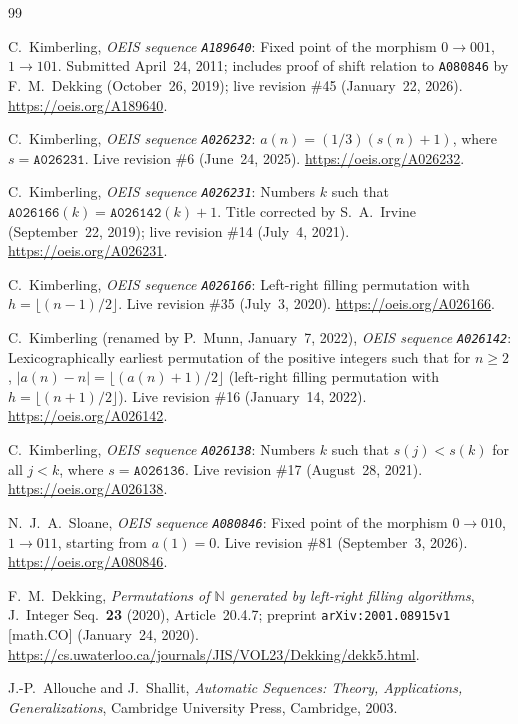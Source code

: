 \documentclass[11pt]{article}
\theoremstyle{definition}
\newcommand{\N}{\mathbb{N}}
\newcommand{\seq}[1]{\texttt{#1}}
\begin{document}
\begin{thebibliography}{99}
\raggedright

C.\ Kimberling, \emph{OEIS sequence \seq{A189640}}: Fixed point of the morphism $0 \to 001$, $1 \to 101$. Submitted April~24, 2011; includes proof of shift relation to \seq{A080846} by F.~M.\ Dekking (October~26, 2019); live revision \#45 (January~22, 2026). \url{https://oeis.org/A189640}.

C.\ Kimberling, \emph{OEIS sequence \seq{A026232}}: $a(n) = (1/3)(s(n) + 1)$, where $s = \seq{A026231}$. Live revision \#6 (June~24, 2025). \url{https://oeis.org/A026232}.

C.\ Kimberling, \emph{OEIS sequence \seq{A026231}}: Numbers $k$ such that $\seq{A026166}(k) = \seq{A026142}(k) + 1$. Title corrected by S.~A.\ Irvine (September~22, 2019); live revision \#14 (July~4, 2021). \url{https://oeis.org/A026231}.

C.\ Kimberling, \emph{OEIS sequence \seq{A026166}}: Left-right filling permutation with $h = \lfloor (n-1)/2 \rfloor$. Live revision \#35 (July~3, 2020). \url{https://oeis.org/A026166}.

C.\ Kimberling (renamed by P.\ Munn, January~7, 2022), \emph{OEIS sequence \seq{A026142}}: Lexicographically earliest permutation of the positive integers such that for $n \ge 2$, $|a(n) - n| = \lfloor (a(n)+1)/2 \rfloor$ (left-right filling permutation with $h = \lfloor (n+1)/2 \rfloor$). Live revision \#16 (January~14, 2022). \url{https://oeis.org/A026142}.

C.\ Kimberling, \emph{OEIS sequence \seq{A026138}}: Numbers $k$ such that $s(j) < s(k)$ for all $j < k$, where $s = \seq{A026136}$. Live revision \#17 (August~28, 2021). \url{https://oeis.org/A026138}.

N.~J.~A.\ Sloane, \emph{OEIS sequence \seq{A080846}}: Fixed point of the morphism $0 \to 010$, $1 \to 011$, starting from $a(1) = 0$. Live revision \#81 (September~3, 2026). \url{https://oeis.org/A080846}.

F.~M.\ Dekking, \emph{Permutations of $\N$ generated by left-right filling algorithms}, J.\ Integer Seq.\ \textbf{23} (2020), Article~20.4.7; preprint \texttt{arXiv:2001.08915v1} [math.CO] (January~24, 2020). \url{https://cs.uwaterloo.ca/journals/JIS/VOL23/Dekking/dekk5.html}.

J.-P.\ Allouche and J.\ Shallit, \emph{Automatic Sequences: Theory, Applications, Generalizations}, Cambridge University Press, Cambridge, 2003.

\end{thebibliography}
\end{document}
